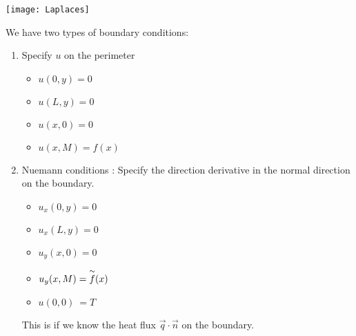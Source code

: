 \begin{enumerate}
  \begin{center}
    \texttt{[image: Laplaces]}
  \end{center}

  We have two types of boundary conditions:
  \begin{enumerate}
    \item Specify $u$ on the perimeter
    \begin{itemize}
      \item $u(0, y) = 0$
      \item $u(L, y) = 0$
      \item $u(x, 0) = 0$
      \item $u(x, M) = f(x)$
    \end{itemize}
    \item Nuemann conditions : Specify the direction derivative in the normal direction on the boundary.
    \begin{itemize}
      \item $u_x(0, y) = 0$
      \item $u_x(L, y) = 0$
      \item $u_y(x, 0) = 0$
      \item $u_y(x, M) = \overset{\sim}{f}(x)$
      \item $u(0, 0)\  = T$
    \end{itemize}
    This is if we know the heat flux $\vec q \cdot \vec n$ on the boundary.
  \end{enumerate}
\end{enumerate}
\newpage

